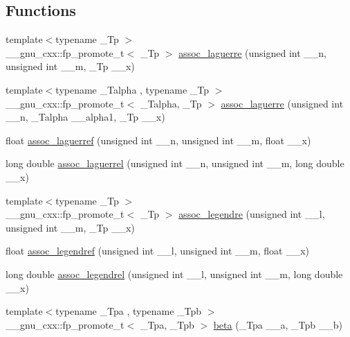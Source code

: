\subsection*{Functions}
\begin{DoxyCompactItemize}
\item 
{\footnotesize template$<$typename \+\_\+\+Tp $>$ }\\\+\_\+\+\_\+gnu\+\_\+cxx\+::fp\+\_\+promote\+\_\+t$<$ \+\_\+\+Tp $>$ \hyperlink{group__mathsf__std_ga0b33e0ac3066f2353861ce2f34b43f57}{assoc\+\_\+laguerre} (unsigned int \+\_\+\+\_\+n, unsigned int \+\_\+\+\_\+m, \+\_\+\+Tp \+\_\+\+\_\+x)
\item 
{\footnotesize template$<$typename \+\_\+\+Talpha , typename \+\_\+\+Tp $>$ }\\\+\_\+\+\_\+gnu\+\_\+cxx\+::fp\+\_\+promote\+\_\+t$<$ \+\_\+\+Talpha, \+\_\+\+Tp $>$ \hyperlink{group__mathsf__std_gab135b6cb6154e6eccb7825ae939602db}{assoc\+\_\+laguerre} (unsigned int \+\_\+\+\_\+n, \+\_\+\+Talpha \+\_\+\+\_\+alpha1, \+\_\+\+Tp \+\_\+\+\_\+x)
\item 
float \hyperlink{group__mathsf__std_gaf83d98f350a1cfcebee6a1f723cf90d2}{assoc\+\_\+laguerref} (unsigned int \+\_\+\+\_\+n, unsigned int \+\_\+\+\_\+m, float \+\_\+\+\_\+x)
\item 
long double \hyperlink{group__mathsf__std_gac8e245671fb2df5de5fd978d03081f6c}{assoc\+\_\+laguerrel} (unsigned int \+\_\+\+\_\+n, unsigned int \+\_\+\+\_\+m, long double \+\_\+\+\_\+x)
\item 
{\footnotesize template$<$typename \+\_\+\+Tp $>$ }\\\+\_\+\+\_\+gnu\+\_\+cxx\+::fp\+\_\+promote\+\_\+t$<$ \+\_\+\+Tp $>$ \hyperlink{group__mathsf__std_ga7aa4182446f687094b12688078517d53}{assoc\+\_\+legendre} (unsigned int \+\_\+\+\_\+l, unsigned int \+\_\+\+\_\+m, \+\_\+\+Tp \+\_\+\+\_\+x)
\item 
float \hyperlink{group__mathsf__std_ga3ced07ddd24bf4af56e2712d148e7f57}{assoc\+\_\+legendref} (unsigned int \+\_\+\+\_\+l, unsigned int \+\_\+\+\_\+m, float \+\_\+\+\_\+x)
\item 
long double \hyperlink{group__mathsf__std_ga55977b425a539146f060dec1c8003344}{assoc\+\_\+legendrel} (unsigned int \+\_\+\+\_\+l, unsigned int \+\_\+\+\_\+m, long double \+\_\+\+\_\+x)
\item 
{\footnotesize template$<$typename \+\_\+\+Tpa , typename \+\_\+\+Tpb $>$ }\\\+\_\+\+\_\+gnu\+\_\+cxx\+::fp\+\_\+promote\+\_\+t$<$ \+\_\+\+Tpa, \+\_\+\+Tpb $>$ \hyperlink{group__mathsf__std_gacd36403ae64b89840b1504f97024dcee}{beta} (\+\_\+\+Tpa \+\_\+\+\_\+a, \+\_\+\+Tpb \+\_\+\+\_\+b)

\end{DoxyCompactItemize}
